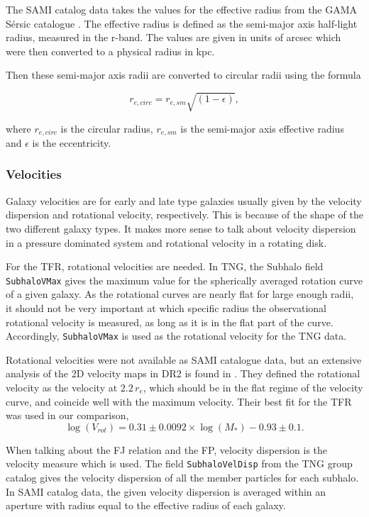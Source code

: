 The SAMI catalog data takes the values for the effective radius from the GAMA Sérsic catalogue \parencite{Driver2011}. The effective radius is defined as the semi-major axis half-light radius, measured in the r-band. The values are given in units of arcsec which were then converted to a physical radius in kpc.

Then these semi-major axis radii are converted to circular radii using the formula

\begin{equation}
   r_{e, circ} = r_{e, sm}\sqrt{(1-\epsilon)},
\end{equation}

where $r_{e, circ}$ is the circular radius, $r_{e,sm}$ is the semi-major axis effective radius and $\epsilon$ is the eccentricity.

\subsubsection{Velocities}

Galaxy velocities are for early and late type galaxies usually given by the velocity dispersion and rotational velocity, respectively. This is because of the shape of the two different galaxy types. It makes more sense to talk about velocity dispersion in a pressure dominated system and rotational velocity in a rotating disk.

For the TFR, rotational velocities are needed. In TNG, the Subhalo field \texttt{SubhaloVMax} gives the maximum value for the spherically averaged rotation curve of a given galaxy. As the rotational curves are nearly flat for large enough radii, it should not be very important at which specific radius the observational rotational velocity is measured, as long as it is in the flat part of the curve. Accordingly, \texttt{SubhaloVMax} is used as the rotational velocity for the TNG data.

Rotational velocities were not available as SAMI catalogue data, but an extensive analysis of the 2D velocity maps in DR2 is found in \textcite{Bloom2017}. They defined the rotational velocity as the velocity at $2.2\, r_e$, which should be in the flat regime of the velocity curve, and coincide well with the maximum velocity. Their best fit for the TFR was used in our comparison, 
\begin{equation}
	\log(V_{rot}) = 0.31 \pm 0.0092 \times \log(M_*)-0.93 \pm 0.1.
\end{equation}

When talking about the FJ relation and the FP, velocity dispersion is the velocity measure which is used. The field \texttt{SubhaloVelDisp} from the TNG group catalog gives the velocity dispersion of all the member particles for each subhalo. In SAMI catalog data, the given velocity dispersion is averaged within an aperture with radius equal to the effective radius of each galaxy.